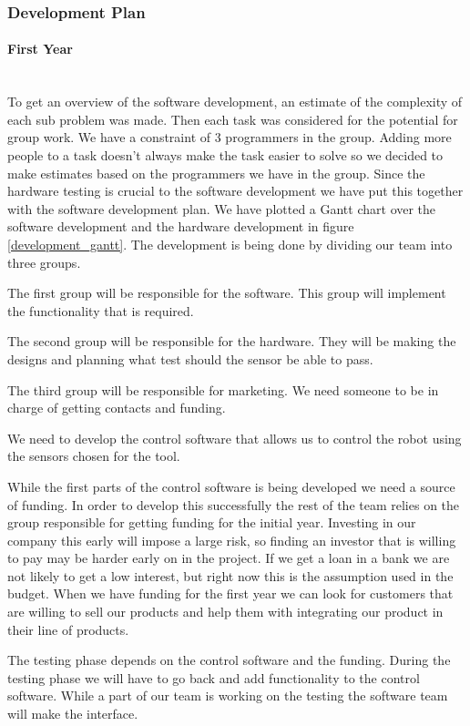 \subsubsection{Development Plan}
\paragraph*{First Year}~\\
To get an overview of the software development, an estimate of the complexity of each sub problem was made.
Then each task was considered for the potential for group work.
We have a constraint of 3 programmers in the group.
Adding more people to a task doesn't always make the task easier to solve so we decided to make estimates based on the programmers we have in the group.
Since the hardware testing is crucial to the software development we have put this together with the software development plan. 
We have plotted a Gantt chart over the software development and the hardware development in figure \ref{development_gantt}.
The development is being done by dividing our team into three groups. 

The first group will be responsible for the software. 
This group will implement the functionality that is required.

The second group will be responsible for the hardware. 
They will be making the designs and planning what test should the sensor be able to pass.

The third group will be responsible for marketing. 
We need someone to be in charge of getting contacts and funding. 

We need to develop the control software that allows us to control the robot using the sensors chosen for the tool. 

While the first parts of the control software is being developed we need a source of funding.
In order to develop this successfully the rest of the team relies on the group responsible for getting funding for the initial year.
Investing in our company this early will impose a large risk, so finding an investor that is willing to pay may be harder early on in the project. 
If we get a loan in a bank we are not likely to get a low interest, but right now this is the assumption used in the budget.
When we have funding for the first year we can look for customers that are willing to sell our products and help them with integrating our product in their line of products.

The testing phase depends on the control software and the funding. 
During the testing phase we will have to go back and add functionality to the control software. 
While a part of our team is working on the testing the software team will make the interface.

